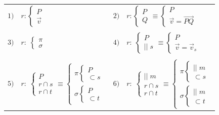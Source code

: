 \begin{table}[H]
\centering
\begin{tabular}{ll}
 $1)\quad r:\begin{cases} P\\ \vec v \end{cases}$
 &  
$2)\quad r:\begin{cases} P\\ Q \end{cases}\equiv \begin{cases} P\\ \vec v=\overrightarrow{PQ} \end{cases}$
 \\ \\
$3)\quad r:\;\begin{cases} \pi\\ \sigma \end{cases}$
 &  
$4) \quad r:\;\begin{cases} P\\ ||\; s \end{cases}\equiv \begin{cases} P\\ \vec v=\vec v_s \end{cases}$
 \\ \\
$5)\quad r:\; \begin{cases} P\\ r\cap s \\ r \cap t \end{cases}\equiv \begin{cases} \pi \begin{cases} P \\ \subset s \end{cases} \\ \sigma \begin{cases} P \\ \subset t \end{cases} \end{cases}$
 & 
 $6) \quad r:\; \begin{cases} ||\; m \\ r \cap s \\ r\cap t \end{cases} \equiv \begin{cases} 
 \pi  \begin{cases}  ||\; m \\ \subset s \end{cases}  \\    \sigma \begin{cases}  ||\; m \\ \subset t \end{cases}
 \end{cases}$
\end{tabular}
\end{table}


